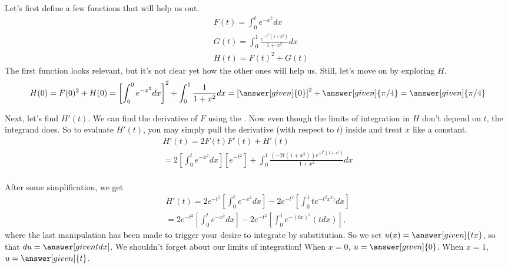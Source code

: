 \documentclass{ximera}
\begin{document}
\begin{exercise}
	Let's first define a few functions that will help us out.
	\begin{align*}
		&F(t)=\int_{0}^{t} e^{-x^2}dx \\
		&G(t)=\int_{0}^{1} \frac{e^{-t^2(1+x^2)}}{1+x^2} dx \\
		&H(t)=F(t)^2+G(t)
	\end{align*}
	The first function looks relevant, but it's not clear yet how the other ones will help us. Still, let's move on by exploring $H$.
	\begin{align*}
	H(0)= F(0)^2+H(0)=\left[\int_{0}^{0} e^{-x^2}dx \right]^2+\int_{0}^{1} \frac{1}{1+x^2} dx =  \left[ \answer[given]{0} \right]^2 + \answer[given]{\pi/4} = \answer[given]{\pi/4}
	\end{align*}
	
	Next, let's find $H'(t)$. We can find the derivative of $F$ using the . Now even though the limits of integration in $H$ don't depend on $t$, the integrand does. So to evaluate $H'(t)$, you may simply pull the derivative (with respect to $t$) inside and treat $x$ like a constant.
	\begin{align*}
	H'(t) =2F(t)F'(t)+H'(t) \\
	=2 \left[ \int_{0}^{t} e^{-x^2}dx \right] \left[ e^{-t^2} \right]+\int_{0}^{1} \frac{ (-2t(1+x^2)) e^{-t^2(1+x^2)}}{1+x^2} dx \\
	\end{align*}
	
	\begin{exercise}
		After some simplification, we get
		\begin{align*}
			H'(t)= 2e^{-t^2} \left[ \int_{0}^{t} e^{-x^2}dx \right] -2e^{-t^2} \left[ \int_{0}^{1} t e^{-t^2 x^2)} dx \right] \\
			=2e^{-t^2} \left[ \int_{0}^{t} e^{-x^2}dx \right] -2e^{-t^2} \left[ \int_{0}^{1} e^{-(tx)^2} (tdx) \right],
		\end{align*}
		where the last manipulation has been made to trigger your desire to integrate by substitution. So we set $u(x)=\answer[given]{tx}$, so that $du=\answer[given{tdx}]$. We shouldn't forget about our limits of integration! When $x=0$, $u=\answer[given]{0}$. When $x=1$, $u=\answer[given]{t}$.
		
	
	\end{exercise}


\end{exercise}
\end{document}
